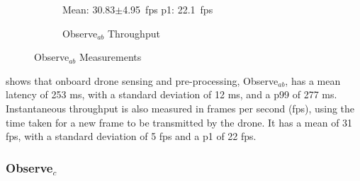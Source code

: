 \begin{figure}[htbp]
\begin{subfigure}[t]{0.45\textwidth}
    \centering
    \small{Mean: 30.83$\pm$4.95~fps\; p1: 22.1~fps}\\
    \caption{Observe$_{ab}$ Throughput}
    \label{fig:observe_ab_throughput}
\end{subfigure}
    \caption{Observe$_{ab}$ Measurements}
    \label{fig:observe_ab_measurements}
\end{figure}

 shows that onboard drone sensing and
pre-processing, Observe$_{ab}$, has a mean latency of 253 ms, with a standard
deviation of 12 ms, and a p99 of 277 ms. Instantaneous throughput is also
measured in frames per second (fps), using the time taken for a new frame to be
transmitted by the drone. It has a mean of 31 fps, with a standard deviation of
5 fps and a p1 of 22 fps.

\subsubsection{\texorpdfstring{Observe$_c$}{Observe\_c}}

